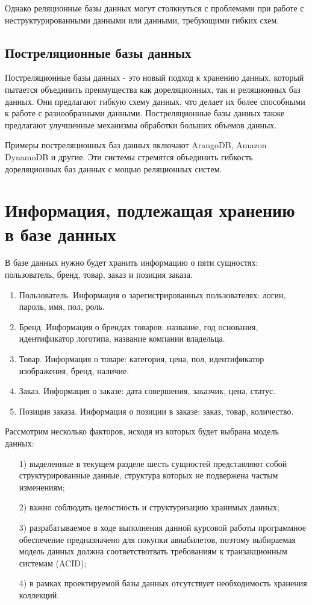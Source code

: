 \documentclass{bmstu}
\begin{document}
Однако реляционные базы данных могут столкнуться с проблемами при работе с неструктурированными данными или данными, требующими гибких схем.

\subsection{Постреляционные базы данных}

Постреляционные базы данных - это новый подход к хранению данных, который пытается объединить преимущества как дореляционных, так и реляционных баз данных. Они предлагают гибкую схему данных, что делает их более способными к работе с разнообразными данными. Постреляционные базы данных также предлагают улучшенные механизмы обработки больших объемов данных.

Примеры постреляционных баз данных включают ArangoDB, Amazon DynamoDB и другие. Эти системы стремятся объединить гибкость дореляционных баз данных с мощью реляционных систем.

\section{Информация, подлежащая хранению в базе данных}

В базе данных нужно будет хранить информацию о пяти сущностях: пользователь, бренд, товар, заказ и позиция заказа.
\begin{enumerate}
\item Пользователь. 
Информация о зарегистрированных пользователях: логин, пароль, имя, пол, роль.
\item Бренд. 
Информация о брендах товаров: название, год основания, идентификатор логотипа, название компании владельца.
\item Товар. 
Информация о товаре: категория, цена, пол, идентификатор изображения, бренд, наличие.
\item Заказ.
Информация о заказе: дата совершения, заказчик, цена, статус.
\item Позиция заказа.
Информация о позиции в заказе: заказ, товар, количество.
\end{enumerate}

Рассмотрим несколько факторов, исходя из которых будет выбрана модель данных:

\begin{enumerate}
\item[1)] выделенные в текущем разделе шесть сущностей представляют собой структурированные данные, структура которых не подвержена частым изменениям;
\item[2)] важно соблюдать целостность и структуризацию хранимых данных;
\item[3)] разрабатываемое в ходе выполнения данной курсовой работы программное обеспечение предназначено для покупки авиабилетов, поэтому выбираемая модель данных должна соответствотвать требованиям к транзакционным системам (ACID);
\item[4)] в рамках проектируемой базы данных отсутствует необходимость хранения коллекций.
\end{enumerate}
 
\end{document}
